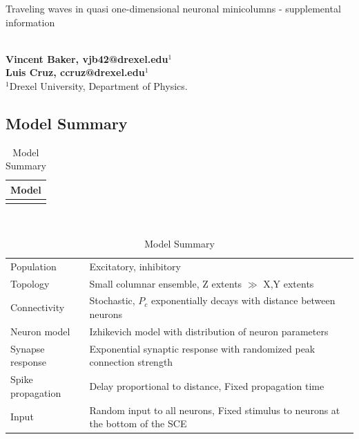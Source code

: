 \documentclass[12pt]{article}
\begin{document}
\vspace{20mm}

{\LARGE Traveling waves in quasi one-dimensional neuronal minicolumns - supplemental information}

\ \\
{\bf \large Vincent Baker, vjb42@drexel.edu$^{\displaystyle 1}$}\\
{\bf \large Luis Cruz, ccruz@drexel.edu$^{\displaystyle 1}$}\\
{$^{\displaystyle 1}$Drexel University, Department of Physics.}\\

\pagebreak

\subsection*{Model Summary}
\begin{table}[!htb]
 \caption{Model Summary}
 \label{tab:all_params}
 \centering
 \begin{tabular}{c}
  \textbf{Model} \\
  \hline \\
 \end{tabular} \\
 \begin{tabular}{l|l}
  Population & Excitatory, inhibitory \\
  Topology & Small columnar ensemble, Z extents $\gg$ X,Y extents \\
  Connectivity & Stochastic, $P_c$ exponentially decays with distance between neurons \\
  Neuron model & Izhikevich model with distribution of neuron parameters \\
  Synapse response & Exponential synaptic response with randomized peak connection strength  \\
  Spike propagation & Delay proportional to distance, Fixed propagation time \\
  Input & Random input to all neurons, Fixed stimulus to neurons at the bottom of the SCE \\
 \end{tabular}
\end{table}

\clearpage
\end{document}
